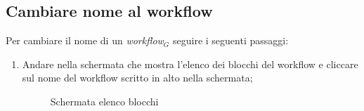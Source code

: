 \subsection{Cambiare nome al workflow}
Per cambiare il nome di un \textit{workflow$_{G}$} seguire i seguenti passaggi:
\begin{enumerate}
	\item Andare nella schermata che mostra l'elenco dei blocchi del workflow e cliccare sul nome del workflow scritto in alto nella schermata;
	\begin{figure}[!ht]
		\centering
		\caption{Schermata elenco blocchi}
	\end{figure}

\end{enumerate}
